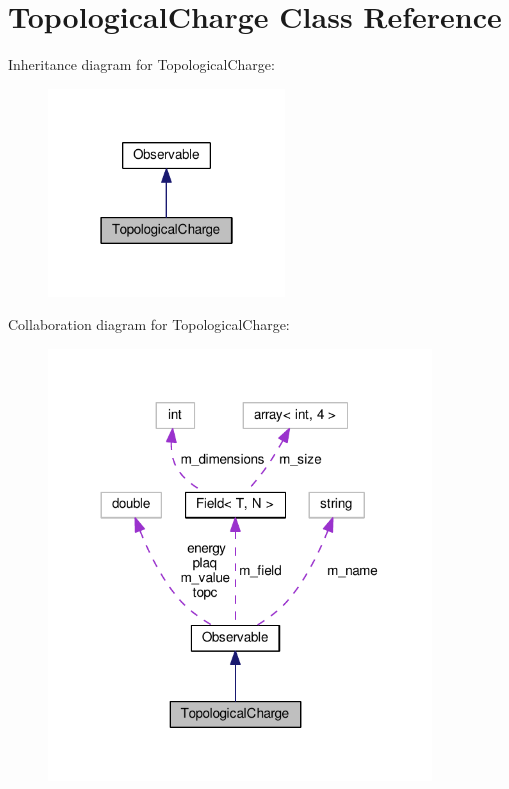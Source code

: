 \hypertarget{classTopologicalCharge}{}\section{Topological\+Charge Class Reference}
\label{classTopologicalCharge}


Inheritance diagram for Topological\+Charge\+:
\nopagebreak
\begin{figure}[H]
\begin{center}
\leavevmode
\includegraphics[width=178pt]{classTopologicalCharge__inherit__graph}
\end{center}
\end{figure}


Collaboration diagram for Topological\+Charge\+:
\nopagebreak
\begin{figure}[H]
\begin{center}
\leavevmode
\includegraphics[width=288pt]{classTopologicalCharge__coll__graph}
\end{center}
\end{figure}
